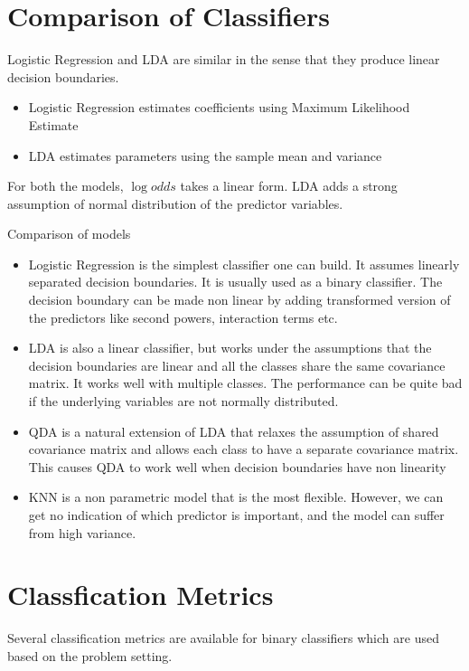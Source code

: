 \documentclass[../statistical_learning_notes.tex]{subfiles}
\begin{document}
    
    \section{Comparison of Classifiers}
    Logistic Regression and LDA are similar in the sense that they produce linear decision boundaries.
    \begin{itemize}
        \item Logistic Regression estimates coefficients using Maximum Likelihood Estimate
        \item LDA estimates parameters using the sample mean and variance
    \end{itemize}
    For both the models, $\log {odds}$ takes a linear form. LDA adds a strong assumption of normal distribution of the predictor variables.\newline
    
    Comparison of models
    \begin{itemize}
        \item Logistic Regression is the simplest classifier one can build. It assumes linearly separated decision boundaries. It is usually used as a binary classifier. The decision boundary can be made non linear by adding transformed version of the predictors like second powers, interaction terms etc.
        \item LDA is also a linear classifier, but works under the assumptions that the decision boundaries are linear and all the classes share the same covariance matrix. It works well with multiple classes. The performance can be quite bad if the underlying variables are not normally distributed.
        \item QDA is a natural extension of LDA that relaxes the assumption of shared covariance matrix and allows each class to have a separate covariance matrix. This causes QDA to work well when decision boundaries have non linearity
        \item KNN is a non parametric model that is the most flexible. However, we can get no indication of which predictor is important, and the model can suffer from high variance.
    \end{itemize}


    \section{Classfication Metrics}
    Several classification metrics are available for binary classifiers which are used based on the problem setting.
\end{document}
